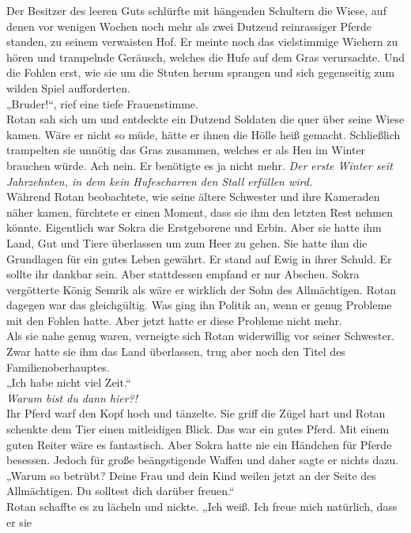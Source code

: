 Der Besitzer des leeren Guts schlürfte mit hängenden Schultern die Wiese, auf denen vor wenigen 
Wochen noch mehr als zwei Dutzend reinrassiger Pferde standen, zu seinem verwaisten Hof. Er 
meinte noch das vielstimmige Wiehern zu hören und trampelnde Geräusch, welches die Hufe auf dem 
Gras verursachte. Und die Fohlen erst, wie sie um die Stuten herum sprangen und sich gegenseitig 
zum wilden Spiel aufforderten.\\
„Bruder!“, rief eine tiefe Frauenstimme.\\
Rotan sah sich um und entdeckte ein Dutzend Soldaten die quer über seine Wiese kamen. Wäre er nicht 
so müde, hätte er ihnen die Hölle heiß gemacht. Schließlich trampelten sie unnötig das Gras 
zusammen, welches er als Heu im Winter brauchen würde. Ach nein. Er benötigte es ja nicht mehr. 
\textit{Der erste Winter seit Jahrzehnten, in dem kein Hufescharren den Stall erfüllen wird.}\\ 
Während Rotan beobachtete, wie seine ältere Schwester und ihre Kameraden näher kamen, fürchtete er 
einen Moment, dass sie ihm den letzten Rest nehmen könnte. Eigentlich war Sokra die Erstgeborene 
und 
Erbin. Aber sie hatte ihm Land, Gut und Tiere überlassen um zum Heer zu gehen. Sie hatte ihm die 
Grundlagen für ein gutes Leben gewährt. Er stand auf Ewig in ihrer Schuld. Er sollte ihr dankbar 
sein. Aber stattdessen empfand er nur Abscheu. Sokra vergötterte König Semrik als wäre er wirklich 
der Sohn des Allmächtigen. Rotan dagegen war das gleichgültig. Was ging ihn Politik an, wenn er 
genug Probleme mit den Fohlen hatte. Aber jetzt hatte er diese Probleme nicht mehr.\\
Als sie nahe genug waren, verneigte sich Rotan widerwillig vor seiner Schwester. Zwar hatte sie ihm 
das Land überlassen, trug aber noch den Titel des Familienoberhauptes.\\
„Ich habe nicht viel Zeit.“\\
\textit{Warum bist du dann hier?!}\\
Ihr Pferd warf den Kopf hoch und tänzelte. Sie griff die Zügel hart und Rotan schenkte dem Tier 
einen mitleidigen Blick. Das war ein gutes Pferd. Mit einem guten Reiter wäre es fantastisch. 
Aber Sokra hatte nie ein Händchen für Pferde besessen. Jedoch für große beängstigende Waffen und 
daher sagte er nichts dazu.\\
„Warum so betrübt? Deine Frau und dein Kind weilen jetzt an der Seite des Allmächtigen. Du solltest 
dich darüber freuen.“\\
Rotan schaffte es zu lächeln und nickte. „Ich weiß. Ich freue mich natürlich, dass er sie 
